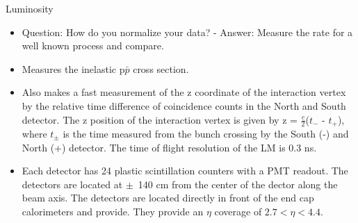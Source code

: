 Luminosity
\begin{itemize}
\item Question: How do you normalize your data? - Answer: Measure the rate for a well known process and compare.
\end{itemize}
\begin{itemize}
\item Measures the inelastic p$\bar{p}$ cross section.
\item Also makes a fast measurement of the z coordinate of the interaction vertex by the relative time difference of coincidence counts in the North and South detector. The z position of the interaction vertex is given by z = $\frac{c}{2}$($t_{-}$ - $t_{+}$), where $t_{\pm}$ is the time measured from the bunch crossing by the South (-) and North (+) detector. The time of flight resolution of the LM is 0.3 ns.
\item Each detector has 24 plastic scintillation counters with a PMT readout. The detectors are located at $\pm$~140 cm from the center of the dector along the beam axis. The detectors are located directly in front of the end cap calorimeters and provide. They provide an $\eta$ coverage of $2.7 < \eta < 4.4$.
\end{itemize}


